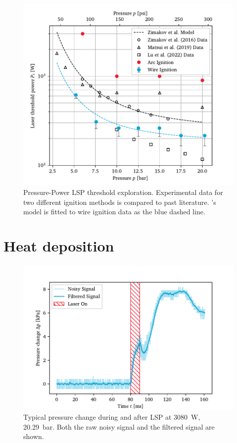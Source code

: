     \begin{figure}[h]
        \centering
        \includegraphics[]{assets/5 results/powerthreshold}
        \caption[Pressure-Power LSP threshold exploration]{Pressure-Power LSP threshold exploration. Experimental data for two different ignition methods is compared to past literature. \textcite{zimakovInteractionNearIRLaser2016}'s model is fitted to wire ignition data as the blue dashed line.}
        \label{fig:powerthreshold}
    \end{figure}

    \section{Heat deposition}

    \begin{figure}[h]
        \centering
        \includegraphics[]{assets/5 results/pressure_noise}
        \caption[Typical pressure change during and after LSP]{Typical pressure change during and after LSP at \qty{3080}{W}, \qty{20.29}{bar}. Both the raw noisy signal and the filtered signal are shown.}
        \label{fig:pressure_noise}
    \end{figure}

